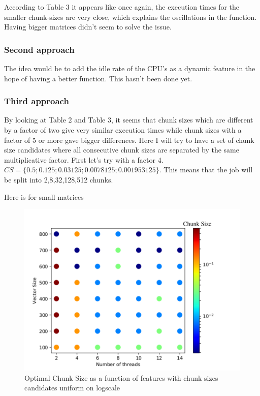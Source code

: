 According to Table 3 it appears like once again, the execution times for the smaller chunk-sizes are very close, which explains the oscillations in the function. Having bigger matrices didn't seem to solve the issue.

\subsubsection{Second approach}

The idea would be to add the idle rate of the CPU's as a dynamic feature in the hope of having a better function.
This hasn't been done yet.

\subsubsection{Third approach}
By looking at Table 2 and Table 3, it seems that chunk sizes which are different by a factor of two give very similar execution times while chunk sizes with a factor of 5 or more gave bigger differences. Here I will try to have a set of chunk size candidates where all consecutive chunk sizes are separated by the same multiplicative factor. First let's try with a factor 4. $CS=\{0.5;0.125;0.03125;0.0078125;0.001953125\}$. This means that the job will be split into 2,8,32,128,512 chunks.

Here is for small matrices

\begin{figure}[H]
	\centering
	\includegraphics[width=120mm]{images/chunk_size_function_matrix_uniform_log.pdf}
	\caption{Optimal Chunk Size as a function of features with chunk sizes candidates uniform on logscale}
\end{figure}

